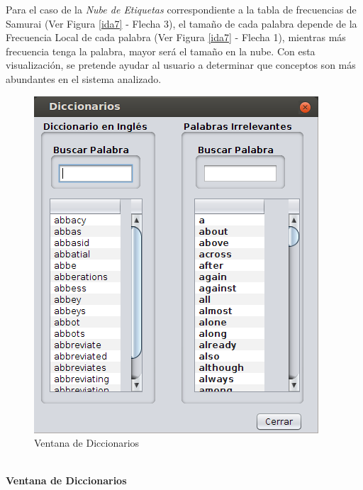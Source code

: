 Para el caso de la \textit{Nube de Etiquetas} correspondiente a la tabla de frecuencias de Samurai (Ver Figura \ref{ida7} - Flecha 3), el tamaño de cada palabra depende de la Frecuencia Local de cada palabra (Ver Figura \ref{ida7} - Flecha 1), mientras más frecuencia tenga la palabra, mayor será el tamaño en la nube. Con esta visualización, se pretende ayudar al usuario a determinar que conceptos son más abundantes en el sistema analizado.


\begin{figure}[t] %
\centerline{%
\includegraphics[scale= 0.58]{./cap4/ida_09.png}
}
\caption{Ventana de Diccionarios}
\label{ida9}
\end{figure}

\noindent \textbf{\\Ventana de Diccionarios\\} 

